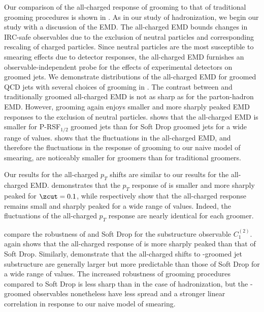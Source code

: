 \documentclass[letterpaper,11pt]{article}
\begin{document}
Our comparison of the all-charged response of \PIRANHA{} grooming to that of traditional grooming procedures is shown in .
%
As in our study of hadronization, we begin our study with a discussion of the EMD.
%
The all-charged EMD bounds changes in IRC-safe observables due to the exclusion of neutral particles and corresponding rescaling of charged particles.
%
Since neutral particles are the most susceptible to smearing effects due to detector responses, the all-charged EMD furnishes an observable-independent probe for the effects of experimental detectors on groomed jets.
%
We demonstrate distributions of the all-charged EMD for groomed QCD jets with several choices of grooming in .
%
The contrast between \PIRANHA{} and traditionally groomed all-charged EMD is not as sharp as for the parton-hadron EMD.
%
However, \PIRANHA{} grooming again enjoys smaller and more sharply peaked EMD responses to the exclusion of neutral particles.
%
 shows that the all-charged EMD is smaller for P-RSF\(_{1/2}\) groomed jets than for Soft Drop groomed jets for a wide range of \zcut{} values.
%
 shows that the fluctuations in the all-charged EMD, and therefore the fluctuations in the response of grooming to our naive model of smearing, are noticeably smaller for \PIRANHA{} groomers than for traditional groomers.

Our results for the all-charged \(p_T\) shifts are similar to our results for the all-charged EMD.
%
 demonstrates that the \(p_T\) response of  is smaller and more sharply peaked for $\zcut = 0.1$, while  respectively show that the  all-charged response remains small and sharply peaked for a wide range of \zcut{} values.
%
Indeed, the fluctuations of the all-charged \(p_T\) response are nearly identical for each \PIRANHA{} groomer.

 compare the robustness of  and Soft Drop for the substructure observable \(C_1^{(2)}\).
%
 again shows that the all-charged response of  is more sharply peaked than that of Soft Drop.
%
Similarly,  demonstrate that the all-charged shifts to \PIRANHA{}-groomed jet substructure are generally larger but more predictable than those of Soft Drop for a wide range of \zcut{} values.
%
The increased robustness of \PIRANHA{} grooming procedures compared to Soft Drop is less sharp than in the case of hadronization, but the \PIRANHA{}-groomed observables nonetheless have less spread and a stronger linear correlation in response to our naive model of smearing.
\end{document}
